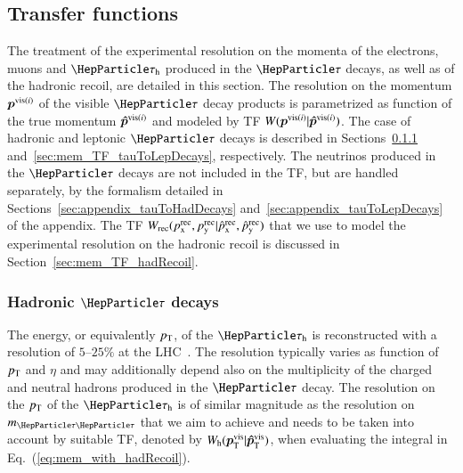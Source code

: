 \subsection{Transfer functions}
\label{sec:mem_TF}

The treatment of the experimental resolution on the momenta of the electrons, muons and $\tauh$ produced in the $\Pgt$ decays,
as well as of the hadronic recoil, are detailed in this section.
The resolution on the momentum $\bm{p}^{\textrm{vis}(i)}$ of the visible $\Pgt$ decay products is parametrized as function of the true momentum $\bm{\hat{p}}^{\textrm{vis}(i)}$
and modeled by TF $W(\bm{p}^{\textrm{vis}(i)}|\bm{\hat{p}}^{\textrm{vis}(i)})$.
The case of hadronic and leptonic $\Pgt$ decays is described in
Sections~\ref{sec:mem_TF_tauToHadDecays}
and~\ref{sec:mem_TF_tauToLepDecays}, respectively.
The neutrinos produced in the $\Pgt$ decays are not
included in the TF, but are handled separately, by the formalism detailed in Sections~\ref{sec:appendix_tauToHadDecays} and~\ref{sec:appendix_tauToLepDecays} of the appendix.
The TF $W_{\textrm{rec}}( p_{\textrm{x}}^{\textrm{rec}},p_{\textrm{y}}^{\textrm{rec}} | \hat{p}_{\textrm{x}}^{\textrm{rec}},\hat{p}_{\textrm{y}}^{\textrm{rec}} )$ that we use to model the experimental resolution on the
hadronic recoil is discussed in Section~\ref{sec:mem_TF_hadRecoil}.


\subsubsection{Hadronic $\Pgt$ decays}
\label{sec:mem_TF_tauToHadDecays}

The energy, or equivalently $p_{\textrm{T}}$, of the $\tauh$ 
is reconstructed with a
resolution of $5$--$25\%$ at the
LHC~\cite{Aad:2014rga,TAU-14-001}.
The resolution typically varies as function of $p_{\textrm{T}}$ and $\eta$ and may additionally depend
also on the multiplicity of the charged and neutral hadrons produced in the $\Pgt$ decay.
The resolution on the $p_{\textrm{T}}$ of the $\tauh$ is of similar magnitude as the
resolution on $m_{\Pgt\Pgt}$ that we aim to achieve and needs to be
taken into account by suitable TF,
denoted by $W_{\textrm{h}}( \bm{p}_{\textrm{T}}^{\textrm{vis}} | \bm{\hat{p}}_{\textrm{T}}^{\textrm{vis}} )$,
when evaluating the integral in Eq.~(\ref{eq:mem_with_hadRecoil}).

